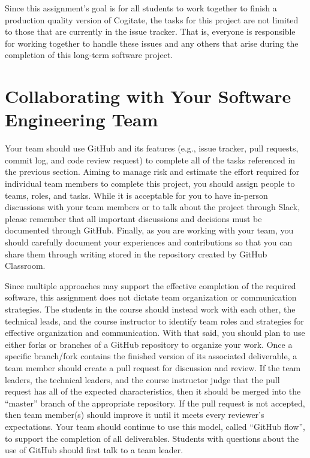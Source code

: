 \documentclass[11pt]{article}
\begin{document}
Since this assignment's goal is for all students to work together to finish a
production quality version of Cogitate, the tasks for this project are not
limited to those that are currently in the issue tracker. That is, everyone is
responsible for working together to handle these issues and any others that
arise during the completion of this long-term software project.

\section*{Collaborating with Your Software Engineering Team}

Your team should use GitHub and its features (e.g., issue tracker, pull
requests, commit log, and code review request) to complete all of the tasks
referenced in the previous section.
%
Aiming to manage risk and estimate the effort required for individual team
members to complete this project, you should assign people to teams, roles, and
tasks. While it is acceptable for you to have in-person discussions with your
team members or to talk about the project through Slack, please remember that
all important discussions and decisions must be documented through GitHub.
Finally, as you are working with your team, you should carefully document your
experiences and contributions so that you can share them through writing stored
in the repository created by GitHub Classroom.

Since multiple approaches may support the effective completion of the required
software, this assignment does not dictate team organization or communication
strategies. The students in the course should instead work with each other, the
technical leads, and the course instructor to identify team roles and strategies
for effective organization and communication. With that said, you should plan to
use either forks or branches of a GitHub repository to organize your work.
%
Once a specific branch/fork contains the finished version of its associated
deliverable, a team member should create a pull request for discussion and
review. If the team leaders, the technical leaders, and the course instructor
judge that the pull request has all of the expected characteristics, then it
should be merged into the ``master'' branch of the appropriate repository. If
the pull request is not accepted, then team member(s) should improve it until it
meets every reviewer's expectations. Your team should continue to use this
model, called ``GitHub flow'', to support the completion of all deliverables.
%
Students with questions about the use of GitHub should first talk to a team
leader.
\end{document}

